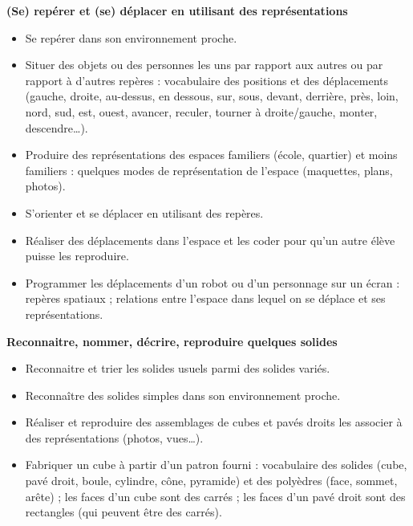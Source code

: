 \begin{prerequis}
{\small
{\bf (Se) repérer et (se) déplacer en utilisant des représentations}
   \begin{itemize}
      \item Se repérer dans son environnement proche.
      \item Situer des objets ou des personnes les uns par rapport aux autres ou par rapport à d’autres repères : vocabulaire des positions et des déplacements (gauche, droite, au-dessus, en dessous, sur, sous, devant, derrière, près, loin, nord, sud, est, ouest, avancer, reculer, tourner à droite/gauche, monter, descendre\dots).
      \item Produire des représentations des espaces familiers (école, quartier) et moins familiers : quelques modes de représentation de l’espace (maquettes, plans, photos).
      \item S’orienter et se déplacer en utilisant des repères.
      \item Réaliser des déplacements dans l’espace et les coder pour qu’un autre élève puisse les reproduire.
      \item Programmer les déplacements d’un robot ou d’un personnage sur un écran : repères spatiaux ; relations entre l’espace dans lequel on se déplace et ses représentations.
   \end{itemize}
{\bf Reconnaitre, nommer, décrire, reproduire quelques solides}
   \begin{itemize}
      \item Reconnaitre et trier les solides usuels parmi des solides variés.
      \item Reconnaître des solides simples dans son environnement proche.
      \item Réaliser et reproduire des assemblages de cubes et pavés droits les associer à des représentations (photos, vues\dots).
      \item Fabriquer un cube à partir d’un patron fourni : vocabulaire des solides (cube, pavé droit, boule, cylindre, cône, pyramide) et des polyèdres (face, sommet, arête) ; les faces d’un cube sont des carrés ; les faces d’un pavé droit sont des rectangles (qui peuvent être des carrés).
   \end{itemize}}
\end{prerequis}

